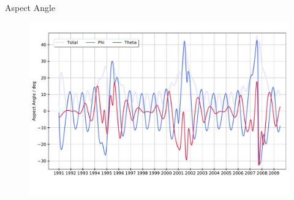 \documentclass{beamer}
\begin{document}
\begin{frame}{Aspect Angle}
\begin{figure}
	\includegraphics[scale=0.34]{Pics/aa_new.pdf}
\end{figure}
\end{frame}

\end{document}
